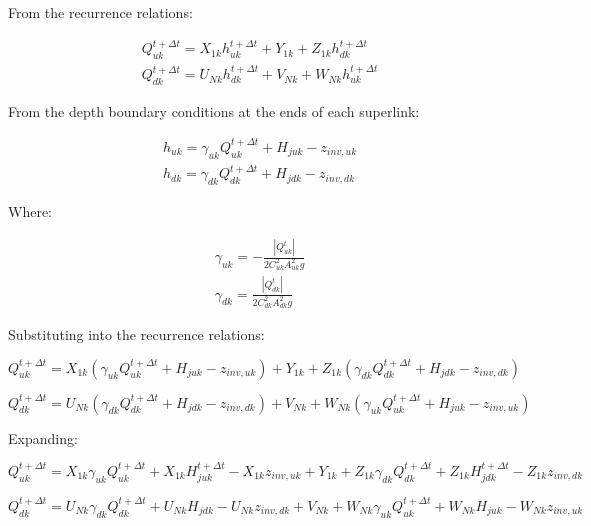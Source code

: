 \documentclass[11pt]{article}
\begin{document}
From the recurrence relations:

\begin{align}
  Q_{uk}^{t + \Delta t} = X_{1k} h_{uk}^{t + \Delta t} + Y_{1k} + Z_{1k} h_{dk}^{t + \Delta t} \\
  Q_{dk}^{t + \Delta t} = U_{Nk} h_{dk}^{t + \Delta t} + V_{Nk} + W_{Nk} h_{uk}^{t + \Delta t}
\end{align}

From the depth boundary conditions at the ends of each superlink:

\begin{align}
  h_{uk} = \gamma_{uk} Q_{uk}^{t + \Delta t} + H_{juk} - z_{inv, uk} \\
  h_{dk} = \gamma_{dk} Q_{dk}^{t + \Delta t} + H_{jdk} - z_{inv, dk}
\end{align}

Where:

\begin{align}
  \gamma_{uk} = -\frac{|Q_{uk}^{t}|}{2 C_{uk}^2 A_{uk}^2 g} \\
  \gamma_{dk} = \frac{|Q_{dk}^{t}|}{2 C_{dk}^2 A_{dk}^2 g}
\end{align}

Substituting into the recurrence relations:

\begin{equation}
  Q_{uk}^{t + \Delta t} = X_{1k} (\gamma_{uk} Q_{uk}^{t + \Delta t} + H_{juk} - z_{inv, uk})
  + Y_{1k} + Z_{1k} (\gamma_{dk} Q_{dk}^{t + \Delta t} + H_{jdk} - z_{inv, dk})
\end{equation}

\begin{equation}
  Q_{dk}^{t + \Delta t} = U_{Nk} (\gamma_{dk} Q_{dk}^{t + \Delta t} + H_{jdk} - z_{inv, dk})
  + V_{Nk} + W_{Nk} (\gamma_{uk} Q_{uk}^{t + \Delta t} + H_{juk} - z_{inv, uk})
\end{equation}

Expanding:

\begin{equation}
   Q_{uk}^{t + \Delta t} = X_{1k} \gamma_{uk} Q_{uk}^{t + \Delta t} + X_{1k} H_{juk}^{t + \Delta t} - X_{1k} z_{inv, uk} + Y_{1k} + Z_{1k} \gamma_{dk} Q_{dk}^{t + \Delta t} + Z_{1k} H_{jdk}^{t + \Delta t} - Z_{1k} z_{inv, dk}
\end{equation}

\begin{equation}
  Q_{dk}^{t + \Delta t} = U_{Nk} \gamma_{dk} Q_{dk}^{t + \Delta t} + U_{Nk} H_{jdk} - U_{Nk} z_{inv, dk}
  + V_{Nk} + W_{Nk} \gamma_{uk} Q_{uk}^{t + \Delta t} + W_{Nk} H_{juk} - W_{Nk} z_{inv, uk}
\end{equation}
\end{document}

